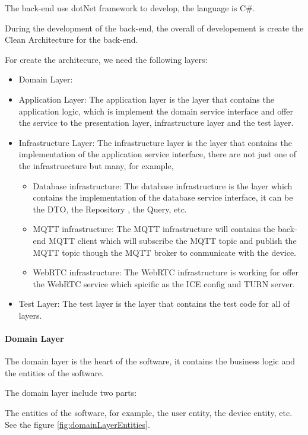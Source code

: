 The back-end use dotNet framework to develop, the language is C\#.

During the development of the back-end, the overall of developement is create 
the Clean Architecture for the back-end.

For create the architecure, we need the following layers:
\begin{itemize}
    \item Domain Layer: 
    \item Application Layer: The application layer is the layer that contains
    the application logic, which is implement the domain service interface
    and offer the service to the presentation layer, infrastructure layer and the test layer.
    \item Infrastructure Layer: The infrastructure layer is the layer that
    contains the implementation of the application service interface, 
    there are not just one of the infrastruecture but many, for example,
    \begin{itemize}
        \item Database infrastructure: The database infrastructure is the layer which
        contains the implementation of the database service interface,
        it can be the DTO, the Repository , the Query, etc.
        \item MQTT infrastructure: The MQTT infrastructure will contains the back-end MQTT client which 
        will subscribe the MQTT topic and publish the MQTT topic though the MQTT broker to conmunicate
        with the device.
        \item WebRTC infrastructure: The WebRTC infrastructure is working for offer the WebRTC service
        which spicific as the ICE config and TURN server.
    \end{itemize} 
    \item Test Layer: The test layer is the layer that contains the test code for all of layers.
\end{itemize}

\paragraph{Domain Layer}
The domain layer is the heart of the software, 
it contains the business logic and the entities of the software.

The domain layer include two parts:

The entities of the software, for example, the user entity, the device entity, etc. 
See the figure \ref{fig:domainLayerEntities}.

